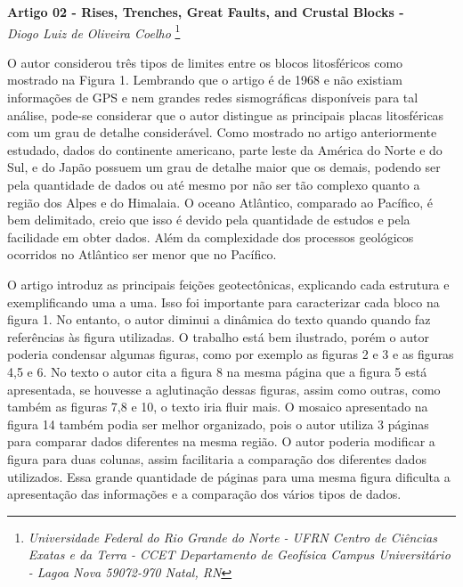 \documentclass[manuscript]{geophysics}[10pt]
\begin{document}
\begin{center}
\textbf{\LARGE
 Artigo 02 - Rises, Trenches, Great Faults, and Crustal Blocks - \cite{morgan_rises_1968}} \\
\textit{Diogo Luiz de Oliveira Coelho}
\footnote{\textit{Universidade Federal do Rio Grande do Norte - UFRN
Centro de Ciências Exatas e da Terra - CCET
Departamento de Geofísica
Campus Universitário - Lagoa Nova
59072-970 Natal, RN}}
\end{center} 

O autor considerou três tipos de limites entre os blocos litosféricos como mostrado na Figura 1. Lembrando que o artigo é de 1968 e não existiam informações de GPS e nem grandes redes sismográficas disponíveis para tal análise, pode-se considerar que o autor distingue as principais placas litosféricas com um grau de detalhe considerável. Como mostrado no artigo anteriormente estudado, dados do continente americano, parte leste da América do Norte e do Sul, e do Japão possuem um grau de detalhe maior que os demais, podendo ser pela quantidade de dados ou até mesmo por não ser tão complexo quanto a região dos Alpes e do Himalaia. O oceano Atlântico, comparado ao Pacífico, é bem delimitado, creio que isso é devido pela quantidade de estudos e pela facilidade em obter dados. Além da complexidade dos processos geológicos ocorridos no Atlântico ser menor que no Pacífico.

O artigo introduz as principais feições geotectônicas, explicando cada estrutura e exemplificando uma a uma. Isso foi importante para caracterizar cada bloco na figura 1. No entanto, o autor diminui a dinâmica do texto quando quando faz referências às figura utilizadas. O trabalho está bem ilustrado, porém o autor poderia condensar algumas figuras, como por exemplo as figuras 2 e 3 e as figuras 4,5 e 6. No texto o autor cita a figura 8 na mesma página que a figura 5 está apresentada, se houvesse a aglutinação dessas figuras, assim como outras, como também as figuras 7,8 e 10, o texto iria fluir mais. O mosaico apresentado na figura 14 também podia ser melhor organizado, pois o autor utiliza 3 páginas para comparar dados diferentes na mesma região. O autor poderia modificar a figura para duas colunas, assim facilitaria a comparação dos diferentes dados utilizados. Essa grande quantidade de páginas para uma mesma figura dificulta a apresentação das informações e a comparação dos vários tipos de dados.  
\end{document}
